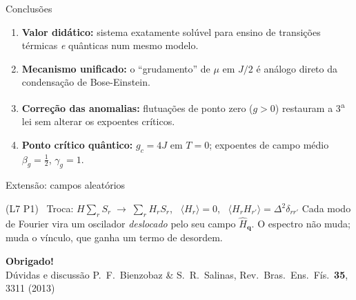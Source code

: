 \documentclass[10pt,aspectratio=169]{beamer}
\newcommand{\lista}[1]{\textcolor{qcdGreen!70!black}{\small(#1)}}
\begin{document}
\begin{frame}{Conclusões}
  \begin{enumerate}
    \item<1-> \textbf{Valor didático:} sistema exatamente solúvel para ensino de
      transições térmicas \emph{e} quânticas num mesmo modelo.
    \item<2-> \textbf{Mecanismo unificado:} o ``grudamento'' de $\mu$ em $J/2$
      é análogo direto da condensação de Bose-Einstein.
    \item<3-> \textbf{Correção das anomalias:} flutuações de ponto zero ($g>0$)
      restauram a 3\textsuperscript{a} lei sem alterar os expoentes críticos.
    \item<4-> \textbf{Ponto crítico quântico:} $g_c=4J$ em $T=0$;
      expoentes de campo médio $\beta_g=\frac{1}{2}$, $\gamma_g=1$.
  \end{enumerate}
\end{frame}

\begin{frame}{Extensão: campos aleatórios}
  \begin{block}{\lista{L7 P1} \ Troca: $H\sum_rS_r\;\to\;\sum_rH_rS_r$, \ $\langle H_r\rangle=0$, \ $\langle H_rH_{r'}\rangle=\Delta^2\delta_{rr'}$}
    Cada modo de Fourier vira um oscilador \emph{deslocado} pelo seu campo $\hat H_{\mathbf q}$.
    O espectro não muda; muda o vínculo, que ganha um termo de desordem.
  \end{block}
\end{frame}

\begin{frame}{}
  \centering\Large
  \textcolor{qcdBlue}{\textbf{Obrigado!}}\\[12pt]
  \normalsize
  Dúvidas e discussão
  \vfill
  {\footnotesize P.~F.~Bienzobaz \& S.~R.~Salinas,
    Rev.\ Bras.\ Ens.\ Fís.\ \textbf{35}, 3311 (2013)}
\end{frame}
\end{document}
